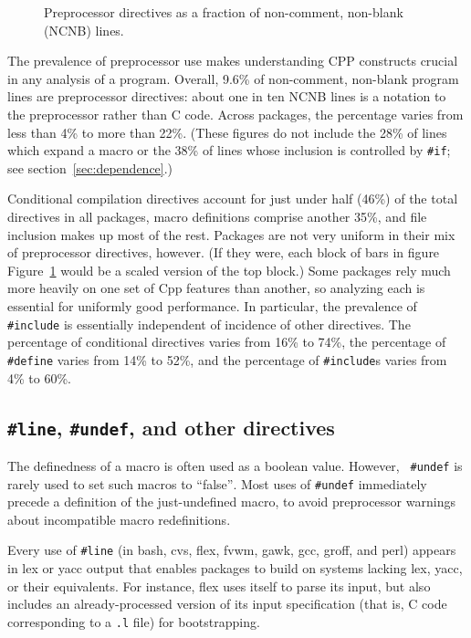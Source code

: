 \documentclass[10pt]{article}
\newcommand{\pkg}[1]{\textsf{#1}}
\begin{document}
\begin{figure}
\centerline{}
\caption{Preprocessor directives as a fraction of non-comment,
  non-blank (NCNB) lines.}
\label{fig:directives-breakdown}
\end{figure}

The prevalence of preprocessor use makes understanding CPP constructs
crucial in any analysis of a program.  Overall, 9.6\% of non-comment,
non-blank program lines are preprocessor directives: about one in ten NCNB
lines is a notation to the preprocessor rather than C code.  Across
packages, the percentage varies from less than 4\% to more than 22\%.
(These figures do not include the 28\% of lines which expand a macro or the
38\% of lines whose inclusion is controlled by {\tt \#if}; see
section~\ref{sec:dependence}.)


Conditional compilation directives account for just under half (46\%) of
the total directives in all packages, macro definitions comprise another
35\%, and file inclusion makes up most of the rest.  Packages are not very
uniform in their mix of preprocessor directives, however.  (If they were,
each block of bars in figure Figure~\ref{fig:directives-breakdown} would be
a scaled version of the top block.)  Some packages rely much more heavily
on one set of Cpp features than another, so analyzing each is essential for
uniformly good performance.  In particular, the prevalence of {\tt
\#include} is essentially independent of incidence of other directives.
The percentage of conditional directives varies from 16\% to 74\%, the
percentage of {\tt \#define} varies from 14\% to 52\%, and the percentage
of {\tt \#include}s varies from 4\% to 60\%.


\subsection{{\tt \#line}, {\tt \#undef}, and other directives}

The definedness of a macro is often used as a boolean value.  However, {\tt
\#undef} is rarely used to set such macros to ``false''$\!$.  Most uses of
{\tt \#undef} immediately precede a definition of the just-undefined macro,
to avoid preprocessor warnings about incompatible macro redefinitions.

Every use of {\tt \#line} (in \pkg{bash}, \pkg{cvs}, \pkg{flex}, \pkg{fvwm},
\pkg{gawk}, \pkg{gcc}, \pkg{groff}, and \pkg{perl}) appears in lex or yacc
output that enables packages to build on systems lacking lex, yacc, or
their equivalents.  For instance, \pkg{flex} uses itself to parse its
input, but also includes an already-processed version of its input
specification (that is, C code corresponding to a {\tt .l} file) for
bootstrapping.
\end{document}

